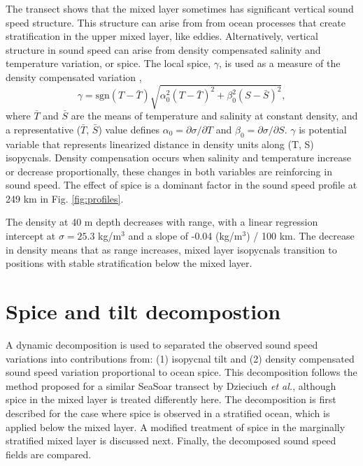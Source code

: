 \documentclass[preprint,NumberedRefs]{JASA}
\begin{document}
The transect shows that the mixed layer sometimes has significant vertical sound speed structure. This structure can arise from from ocean processes that create stratification in the upper mixed layer, like eddies. Alternatively, vertical structure in sound speed can arise from density compensated salinity and temperature variation, or spice. The local spice, $\gamma$, is used as a measure of the density compensated variation \citep{klymak2015spice},
\begin{equation}
    \gamma=\textrm{sgn}(T-\bar{T}) \sqrt{\alpha_0^2(T-\bar{T})^2 +\beta_0^2(S-\bar{S})^2},
    \label{eq:gamma}
\end{equation}
where $\bar{T}$ and $\bar{S}$ are the means of temperature and salinity at constant density, and a representative ($\bar{T}$, $\bar{S}$) value defines $\alpha_0=\partial \sigma / \partial T$ and $\beta_0=\partial \sigma / \partial S$. $\gamma$ is potential variable that represents linearized distance in density units along (T, S) isopycnals. Density compensation occurs when salinity and temperature increase or decrease proportionally, these changes in both variables are reinforcing in sound speed. The effect of spice is a dominant factor in the sound speed profile at 249 km in Fig. \ref{fig:profiles}.

The density at 40 m depth decreases with range, with a linear regression intercept at $\sigma=25.3$ kg/m$^3$ and a slope of -0.04 (kg/m$^3$) / 100 km. The decrease in density means that as range increases, mixed layer isopycnals transition to positions with stable stratification below the mixed layer.

\section{\label{sec:decomposition}Spice and tilt decompostion}
A dynamic decomposition is used to separated the observed sound speed variations into contributions from: (1) isopycnal tilt and (2) density compensated sound speed variation proportional to ocean spice. This decomposition follows the method proposed for a similar SeaSoar transect by Dzieciuch \emph{et al.}\citep{dzieciuch2004}, although spice in the mixed layer is treated differently here. The decomposition is first described for the case where spice is observed in a stratified ocean, which is applied below the mixed layer. A modified treatment of spice in the marginally stratified mixed layer is discussed next. Finally, the decomposed sound speed fields are compared.
\end{document}
